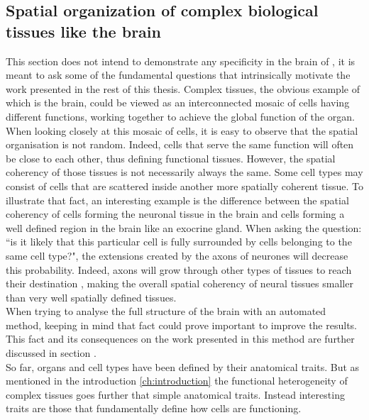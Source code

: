           \subsection{Spatial organization of complex biological tissues like the brain}
     This section does not intend to demonstrate any specificity in the brain of \platy{}, it is meant to ask some of the fundamental questions that intrinsically motivate the work presented in the rest of this thesis. Complex tissues, the obvious example of which is the brain, could be viewed as an interconnected mosaic of cells having different functions, working together to achieve the global function of the organ.\\
     
     When looking closely at this mosaic of cells, it is easy to observe that the spatial organisation is not random. Indeed, cells that serve the same function will often be close to each other, thus defining functional tissues. However, the spatial coherency of those tissues is not necessarily always the same. Some cell types may consist of cells that are scattered inside another more spatially coherent tissue. To illustrate that fact, an interesting example is the difference between the spatial coherency of cells forming the neuronal tissue in the brain and cells forming a well defined region in the brain like an exocrine gland. When asking the question: ``is it likely that this particular cell is fully surrounded by cells belonging to the same cell type?", the extensions created by the axons of neurones will decrease this probability. Indeed, axons will grow through other types of tissues to reach their destination \cite{bartlett84,colello90}, making the overall spatial coherency of neural tissues smaller than very well spatially defined tissues.\\
     
     When trying to analyse the full structure of the brain with an automated method, keeping in mind that fact could prove important to improve the results. This fact and its consequences on the work presented in this method are further discussed in section .\\
     
     So far, organs and cell types have been defined by their anatomical traits. But as mentioned in the introduction \ref{ch:introduction} the functional heterogeneity of complex tissues goes further that simple anatomical traits. Instead interesting traits are those that fundamentally define how cells are functioning.
     
